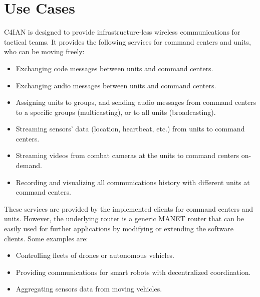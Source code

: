 \chapter{Use Cases}

C4IAN is designed to provide infrastructure-less wireless communications for tactical teams. It provides the following services for command centers and units, who can be moving freely:
\begin{itemize}[noitemsep, topsep=0pt]
    \item Exchanging code messages between units and command centers.
    \item Exchanging audio messages between units and command centers.
    \item Assigning units to groups, and sending audio messages from command centers to a specific groups (multicasting), or to all units (broadcasting).
    \item Streaming sensors' data (location, heartbeat, etc.) from units to command centers.
    \item Streaming videos from combat cameras at the units to command centers on-demand.
    \item Recording and visualizing all communications history with different units at command centers.
\end{itemize} 

\vspace{\baselineskip}

These services are provided by the implemented clients for command centers and units. However, the underlying router is a generic MANET router that can be easily used for further applications by modifying or extending the software clients. Some examples are:
\begin{itemize}[noitemsep, topsep=0pt]
    \item Controlling fleets of drones or autonomous vehicles.
    \item Providing communications for smart robots with decentralized coordination.
    \item Aggregating sensors data from moving vehicles.
\end{itemize}
